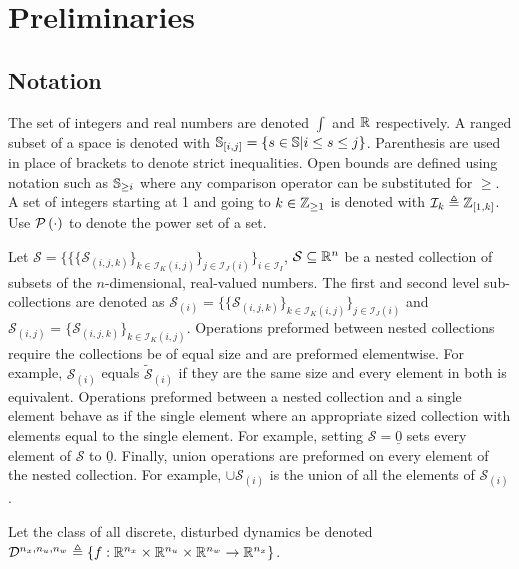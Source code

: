 \section{Preliminaries}
\subsection{Notation}
The set of integers and real numbers are denoted $\int$ and $\mathbb{R}$ respectively. A ranged subset of a space is denoted with $\mathbb{S}_{[i,j]}=\{s\in\mathbb{S}|i\leq s\leq j\}$. Parenthesis are used in place of brackets to denote strict inequalities. Open bounds are defined using notation such as $\mathbb{S}_{\geq i}$ where any comparison operator can be substituted for $\geq$. A set of integers starting at 1 and going to $k\in\mathbb{Z}_{\geq 1}$ is denoted with $\mathcal{I}_{k}\triangleq\mathbb{Z}_{[1,k]}$. Use $\mathcal{P}\left(\cdot\right)$ to denote the power set of a set. 

Let $\mathcal{S}=\{\{\{\mathcal{S}_{(i,j,k)}\}_{k\in\mathcal{I}_{K}(i,j)}\}_{j\in\mathcal{I}_{J}(i)}\}_{i\in\mathcal{I}_I}$, $\mathcal{S}\subseteq\mathbb{R}^n$ be a nested collection of subsets of the $n$-dimensional, real-valued numbers. The first and second level sub-collections are denoted as $\mathcal{S}_{(i)}=\{\{\mathcal{S}_{(i,j,k)}\}_{k\in\mathcal{I}_{K}(i,j)}\}_{j\in\mathcal{I}_{J}(i)}$ and $\mathcal{S}_{(i,j)}=\{\mathcal{S}_{(i,j,k)}\}_{k\in\mathcal{I}_{K}(i,j)}$. Operations preformed between nested collections require the collections be of equal size and are preformed elementwise. For example, $\mathcal{S}_{(i)}$ equals $\tilde{\mathcal{S}}_{(i)}$ if they are the same size and every element in both is equivalent. Operations preformed between a nested collection and a single element behave as if the single element where an appropriate sized collection with elements equal to the single element. For example, setting $\mathcal{S}=\underline{0}$ sets every element of $\mathcal{S}$ to $\underline{0}$. Finally, union operations are preformed on every element of the nested collection. For example, $\cup \mathcal{S}_{(i)}$ is the union of all the elements of $\mathcal{S}_{(i)}$.

Let the class of all discrete, disturbed dynamics be denoted $\mathcal{D}^{{n_x},{n_u},{n_w}}\triangleq\{f:\mathbb{R}^{{n_x}}\times\mathbb{R}^{{n_u}}\times\mathbb{R}^{{n_w}}\rightarrow\mathbb{R}^{{n_x}}\}$. 

